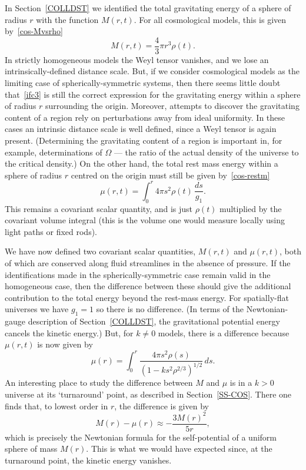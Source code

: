 \documentclass[a4paper]{article}
\numberwithin{equation}{section}
\newcommand{\Om}{\Omega}
\begin{document}
In Section~\ref{COLLDST} we identified the total gravitating energy of
a sphere of radius $r$ with the function $M(r,t)$.  For all
cosmological models, this is given by~\eqref{cos-Mvsrho}
%
\begin{equation}
M(r,t) = \frac{4}{3} \pi r^3 \rho(t).
\label{ifc3}
\end{equation}
%
In strictly homogeneous models the Weyl tensor vanishes, and we lose
an intrin\-sically-defined distance scale.  But, if we consider
cosmological models as the limiting case of spherically-symmetric
systems, then there seems little doubt that~\eqref{ifc3} is still the
correct expression for the gravitating energy within a sphere of
radius $r$ surrounding the origin.  Moreover, attempts to discover the
gravitating content of a region rely on perturbations away from ideal
uniformity.  In these cases an intrinsic distance scale is well
defined, since a Weyl tensor is again present.  (Determining the
gravitating content of a region is important in, for example,
determinations of $\Om$ --- the ratio of the actual density of the
universe to the critical density.)  On the other hand, the total rest
mass energy within a sphere of radius $r$ centred on the origin must
still be given by~\eqref{cos-restm}
%
\begin{equation}
\mu(r,t) = \int_0^r 4 \pi s^2 \rho(t) \, \frac{ds}{g_1}.
\label{ifc5}
\end{equation}
%
This remains a covariant scalar quantity, and is just $\rho(t)$
multiplied by the covariant volume integral (this is the volume one
would measure locally using light paths or fixed rods).


We have now defined two covariant scalar quantities, $M(r,t)$ and
$\mu(r,t)$, both of which are conserved along fluid streamlines in the
absence of pressure.  If the identifications made in the
spherically-symmetric case remain valid in the homogeneous case, then
the difference between these should give the additional contribution
to the total energy beyond the rest-mass energy.  For spatially-flat
universes we have $g_1=1$ so there is no difference.  (In terms of the
Newtonian-gauge description of Section~\ref{COLLDST}, the
gravitational potential energy cancels the kinetic energy.)  But, for
$k\neq 0$ models, there is a difference because $\mu(r,t)$ is now
given by
%
\begin{equation}
\mu(r) = \int_0^r \frac{4 \pi s^2 \rho(s)}{(1-ks^2\rho^{2/3})^{1/2}}
\, ds.
\end{equation}
%
An interesting place to study the difference between $M$ and $\mu$ is
in a $k>0$ universe at its `turnaround' point, as described in
Section~\ref{SS-COS}.  There one finds that, to lowest order in $r$,
the difference is given by
%
\begin{equation}
M(r) - \mu(r) \approx -\frac{3 M(r)^2}{5r},
\end{equation}
%
which is precisely the Newtonian formula for the self-potential of a
uniform sphere of mass $M(r)$.  This is what we would have expected
since, at the turnaround point, the kinetic energy vanishes.  
\end{document}
